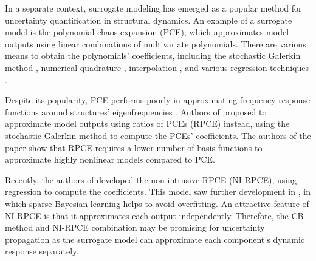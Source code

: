 In a separate context, surrogate modeling has emerged as a popular method for uncertainty quantification in structural dynamics.
An example of a surrogate model is the polynomial chaos expansion (PCE), which approximates model outputs using linear combinations of multivariate polynomials.
There are various means to obtain the polynomials' coefficients, including the stochastic Galerkin method \cite{Ghanem1991}, numerical quadrature \cite{xiu2007efficient}, interpolation \cite{babuvska2007stochastic}, and various regression techniques \cite{berveiller2006stochastic}\cite{blatman2010adaptive}\cite{blatman2011adaptive}.

Despite its popularity, PCE performs poorly in approximating frequency response functions around structures' eigenfrequencies \cite{jacquelin2015polynomial}.
Authors of \cite{jacquelin2017polynomial} proposed to approximate model outputs using ratios of PCEs (RPCE) instead, using the stochastic Galerkin method to compute the PCEs' coefficients.
The authors of the paper show that RPCE requires a lower number of basis functions to approximate highly nonlinear models compared to PCE.

Recently, the authors of \cite{schneider2020polynomial} developed the non-intrusive RPCE (NI-RPCE), using regression to compute the coefficients.
This model saw further development in \cite{schneider2023sparse}, in which sparse Bayesian learning helps to avoid overfitting.
An attractive feature of NI-RPCE is that it approximates each output independently.
Therefore, the CB method and NI-RPCE combination may be promising for uncertainty propagation as the surrogate model can approximate each component's dynamic response separately.